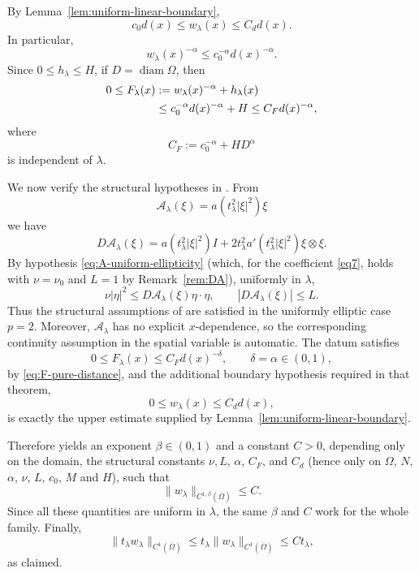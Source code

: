\documentclass[11pt,leqno]{amsart}
\makeatletter
\renewenvironment{proof}[1][\proofname]{%
  \par
  \pushQED{\qed}%
  \normalfont
  \topsep6\p@\@plus6\p@\relax
  \trivlist
  \item[\hskip\labelsep\itshape #1\@addpunct{.}]%
  \hspace{0.5em}\ignorespaces
}{%
  \popQED
  \endtrivlist\@endpefalse
}
\makeatother
\begin{document}
\begin{proof}
By Lemma~\ref{lem:uniform-linear-boundary},
\[
 c_0d(x)\le w_\lambda(x)\le C_dd(x).
\]
In particular,
\[
 w_\lambda(x)^{-\alpha}
 \le c_0^{-\alpha}d(x)^{-\alpha}.
\]
Since $0\le h_\lambda\le H$, if
$D=\operatorname{diam}\Omega$, then
\begin{align}
 0\le F_\lambda(x)
 &:=
 w_\lambda(x)^{-\alpha}+h_\lambda(x)\notag\\
 &\le c_0^{-\alpha}d(x)^{-\alpha}+H
 \le C_Fd(x)^{-\alpha},
 \label{eq:F-pure-distance}
\end{align}
where
\[
 C_F:=c_0^{-\alpha}+HD^\alpha
\]
is independent of $\lambda$.

We now verify the structural hypotheses in
\cite[Theorem B.1]{GiacomoniSchindlerTakac}.  From
\[
 \mathcal A_\lambda(\xi)
 =a(t_\lambda^2|\xi|^2)\xi
\]
we have
\begin{equation}\label{eq:DA-lambda-final}
 D\mathcal A_\lambda(\xi)
 =
 a(t_\lambda^2|\xi|^2)I
 +
 2t_\lambda^2a'(t_\lambda^2|\xi|^2)\xi\otimes\xi.
\end{equation}
By hypothesis \eqref{eq:A-uniform-ellipticity} (which, for the
coefficient \eqref{eq7}, holds with $\nu=\nu_0$ and $L=1$ by
Remark~\ref{rem:DA}), uniformly in $\lambda$,
\[
 \nu|\eta|^2
 \le D\mathcal A_\lambda(\xi)\eta\cdot\eta,
 \qquad
 |D\mathcal A_\lambda(\xi)|\le L.
\]
Thus the structural assumptions of
\cite[Theorem B.1]{GiacomoniSchindlerTakac} are satisfied in the
uniformly elliptic case $p=2$.  Moreover,
$\mathcal A_\lambda$ has no explicit $x$-dependence, so the
corresponding continuity assumption in the spatial variable is
automatic.  The datum satisfies
\[
 0\le F_\lambda(x)\le C_Fd(x)^{-\delta},
 \qquad \delta=\alpha\in(0,1),
\]
by \eqref{eq:F-pure-distance}, and the additional boundary hypothesis
required in that theorem,
\[
 0\le w_\lambda(x)\le C_dd(x),
\]
is exactly the upper estimate supplied by
Lemma~\ref{lem:uniform-linear-boundary}.

Therefore \cite[Theorem B.1]{GiacomoniSchindlerTakac} yields an
exponent $\beta\in(0,1)$ and a constant $C>0$, depending only on the
domain, the structural constants $\nu,L$, $\alpha$, $C_F$, and $C_d$
(hence only on $\Omega$, $N$, $\alpha$, $\nu$, $L$, $c_0$, $M$ and $H$), such
that
\[
 \|w_\lambda\|_{C^{1,\beta}(\overline\Omega)}\le C.
\]
Since all these quantities are uniform in $\lambda$, the same
$\beta$ and $C$ work for the whole family.  Finally,
\[
 \|t_\lambda w_\lambda\|_{C^1(\overline\Omega)}
 \le
 t_\lambda\|w_\lambda\|_{C^1(\overline\Omega)}
 \le Ct_\lambda,
\]
as claimed.
\end{proof}
\end{document}
